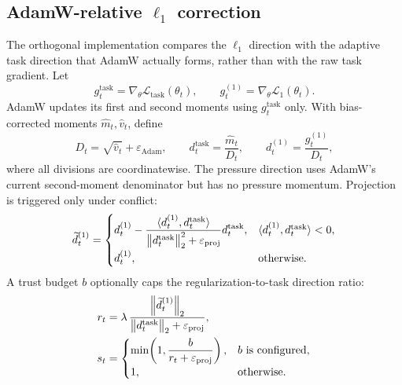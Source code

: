 \subsection{AdamW-relative $\ell_1$ correction}
\label{sec:adam-relative-update}

The orthogonal implementation compares the $\ell_1$ direction with the
adaptive task direction that AdamW actually forms, rather than with the raw
task gradient. Let
\begin{equation}
    g_t^{\mathrm{task}}=\nabla_\theta\mathcal L_{\mathrm{task}}(\theta_t),
    \qquad
    g_t^{(1)}=\nabla_\theta\mathcal L_1(\theta_t).
    \label{eq:raw-gradients}
\end{equation}
AdamW updates its first and second moments using $g_t^{\mathrm{task}}$ only.
With bias-corrected moments $\widehat m_t,\widehat v_t$, define
\begin{equation}
    D_t=\sqrt{\widehat v_t}+\varepsilon_{\mathrm{Adam}},
    \qquad
    d_t^{\mathrm{task}}=\frac{\widehat m_t}{D_t},
    \qquad
    d_t^{(1)}=\frac{g_t^{(1)}}{D_t},
    \label{eq:adam-space-directions}
\end{equation}
where all divisions are coordinatewise. The pressure direction uses AdamW's
current second-moment denominator but has no pressure momentum. Projection is
triggered only under conflict:
\begin{equation}
    \widetilde d_t^{(1)}
      =
      \begin{cases}
      \displaystyle
      d_t^{(1)}-
      \frac{\langle d_t^{(1)},d_t^{\mathrm{task}}\rangle}
           {\left\lVert d_t^{\mathrm{task}}\right\rVert_2^2+\varepsilon_{\mathrm{proj}}}
      d_t^{\mathrm{task}},
      &\langle d_t^{(1)},d_t^{\mathrm{task}}\rangle<0,\\[1.1em]
      d_t^{(1)},&\text{otherwise}.
      \end{cases}
    \label{eq:conflict-projection}
\end{equation}
A trust budget $b$ optionally caps the regularization-to-task direction ratio:
\begin{align}
    r_t
      &=\lambda\,
        \frac{\left\lVert \widetilde d_t^{(1)}\right\rVert_2}
             {\left\lVert d_t^{\mathrm{task}}\right\rVert_2+\varepsilon_{\mathrm{proj}}},
    \label{eq:raw-step-ratio}\\
    s_t
      &=\begin{cases}
        \min\!\left(1,\dfrac{b}{r_t+\varepsilon_{\mathrm{proj}}}\right),
        &b\ \text{is configured},\\
        1,&\text{otherwise}.
        \end{cases}
    \label{eq:budget-scale}
\end{align}
